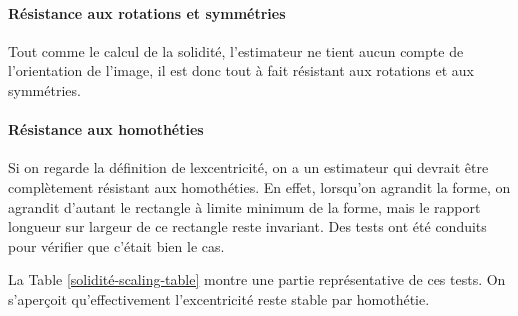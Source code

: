 \documentclass{article}
\theoremstyle{definition}
\begin{document}
	\paragraph{Résistance aux rotations et symmétries}
      
	  Tout comme le calcul de la solidité, l'estimateur ne tient aucun compte de l'orientation de l'image, il est donc tout à fait résistant aux rotations et aux symmétries.
      
	\paragraph{Résistance aux homothéties}
	
	  Si on regarde la définition de lexcentricité, on a un estimateur qui devrait être complètement résistant aux homothéties. En effet, lorsqu'on agrandit la forme, on agrandit d'autant le rectangle à limite minimum de la forme, mais le rapport longueur sur largeur de ce rectangle reste invariant. Des tests ont été conduits pour vérifier que c'était bien le cas.
	  
	  La Table \ref{solidité-scaling-table} montre une partie représentative de ces tests. On s'aperçoit qu'effectivement l'excentricité reste stable par homothétie.\\
	
\end{document}
